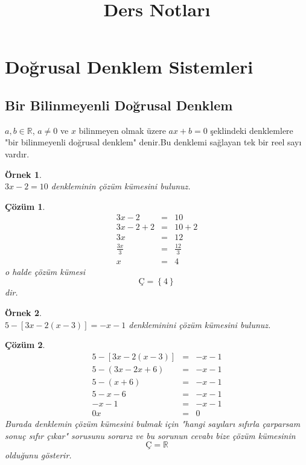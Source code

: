 \documentclass[a4paper,10pt]{book}
\title{Ders Notları}
\date{}
\theoremstyle{italik}
\newtheorem{ornek}{Örnek}[chapter]
\newtheorem*{cozum}{Çözüm}
\begin{document}
\maketitle
\section{Doğrusal Denklem Sistemleri}
\subsection{Bir Bilinmeyenli Doğrusal Denklem}
$a,b\in\mathbb{R}$, $a\not=0$ ve $x$ bilinmeyen olmak üzere $ax+b=0$ şeklindeki denklemlere "bir bilinmeyenli
doğrusal denklem" denir.Bu denklemi sağlayan tek bir reel sayı vardır.

\begin{ornek}
\quad\\
$3x-2=10$ denkleminin çözüm kümesini bulunuz.
\end{ornek}

\begin{cozum}
	\begin{eqnarray*}
		3x-2         & = & 10 \\
		3x-2+2       & = & 10+2 \\
		3x           & = & 12 \\
		\frac{3x}{3} & = & \frac{12}{3} \\
		x            & = & 4
	\end{eqnarray*}
	o halde çözüm kümesi $$\text{Ç}=\left\{4\right\}$$ dir.
\end{cozum}

\begin{ornek}
	\quad\\
	$5-\left[3x-2(x-3)\right]=-x-1$ denkleminini çözüm kümesini bulunuz.
\end{ornek}

\begin{cozum}
	\begin{eqnarray*}
		5-\left[3x-2(x-3)\right] & = & -x-1 \\
		5-\left(3x-2x+6\right)   & = & -x-1 \\
		5-\left(x+6\right)       & = & -x-1 \\
		5-x-6                    & = & -x-1 \\
		-x-1                     & = & -x-1 \\
		0x                       & = & 0
	\end{eqnarray*}
	Burada denklemin çözüm kümesini bulmak için "hangi sayıları sıfırla çarparsam sonuç sıfır çıkar"
	sorusunu sorarız ve bu sorunun cevabı bize çözüm kümesinin
	$$\text{Ç}=\mathbb{R}$$
	olduğunu gösterir.
\end{cozum}
\end{document}
